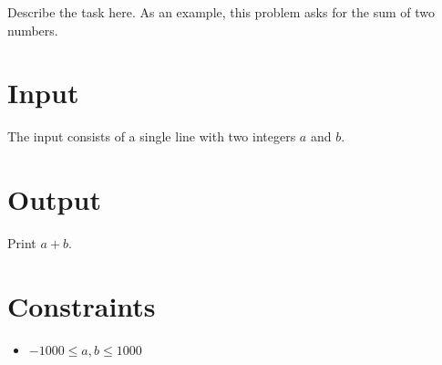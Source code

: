 
Describe the task here. As an example, this problem asks for the sum of two
numbers.

\section*{Input}
The input consists of a single line with two integers $a$ and $b$.

\section*{Output}
Print $a + b$.

\section*{Constraints}
\begin{itemize}
  \item $-1000 \leq a, b \leq 1000$
\end{itemize}
